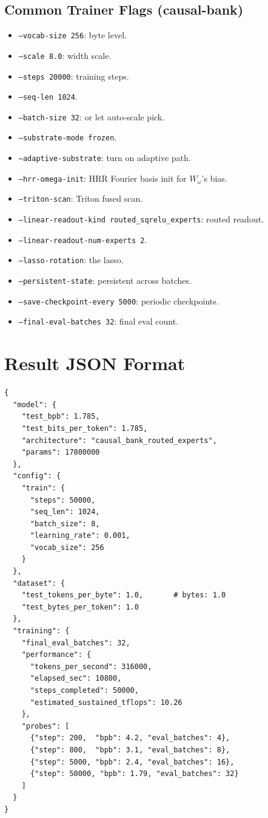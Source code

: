 \documentclass[11pt,openany]{book}
\theoremstyle{definition}
\theoremstyle{plain}
\newcommand{\omegaproj}{W_\omega}
\begin{document}
\section{Common Trainer Flags (causal-bank)}

\begin{itemize}
  \item \texttt{--vocab-size 256}: byte level.
  \item \texttt{--scale 8.0}: width scale.
  \item \texttt{--steps 20000}: training steps.
  \item \texttt{--seq-len 1024}.
  \item \texttt{--batch-size 32}: or let auto-scale pick.
  \item \texttt{--substrate-mode frozen}.
  \item \texttt{--adaptive-substrate}: turn on adaptive path.
  \item \texttt{--hrr-omega-init}: HRR Fourier basis init for
    $\omegaproj$'s bias.
  \item \texttt{--triton-scan}: Triton fused scan.
  \item \texttt{--linear-readout-kind routed\_sqrelu\_experts}: routed
    readout.
  \item \texttt{--linear-readout-num-experts 2}.
  \item \texttt{--lasso-rotation}: the lasso.
  \item \texttt{--persistent-state}: persistent across batches.
  \item \texttt{--save-checkpoint-every 5000}: periodic checkpoints.
  \item \texttt{--final-eval-batches 32}: final eval count.
\end{itemize}

\chapter{Result JSON Format}

\begin{lstlisting}[caption={Canonical result JSON shape},basicstyle=\ttfamily\footnotesize]
{
  "model": {
    "test_bpb": 1.785,
    "test_bits_per_token": 1.785,
    "architecture": "causal_bank_routed_experts",
    "params": 17800000
  },
  "config": {
    "train": {
      "steps": 50000,
      "seq_len": 1024,
      "batch_size": 8,
      "learning_rate": 0.001,
      "vocab_size": 256
    }
  },
  "dataset": {
    "test_tokens_per_byte": 1.0,       # bytes: 1.0
    "test_bytes_per_token": 1.0
  },
  "training": {
    "final_eval_batches": 32,
    "performance": {
      "tokens_per_second": 316000,
      "elapsed_sec": 10800,
      "steps_completed": 50000,
      "estimated_sustained_tflops": 10.26
    },
    "probes": [
      {"step": 200,  "bpb": 4.2, "eval_batches": 4},
      {"step": 800,  "bpb": 3.1, "eval_batches": 8},
      {"step": 5000, "bpb": 2.4, "eval_batches": 16},
      {"step": 50000, "bpb": 1.79, "eval_batches": 32}
    ]
  }
}
\end{lstlisting}
\end{document}
